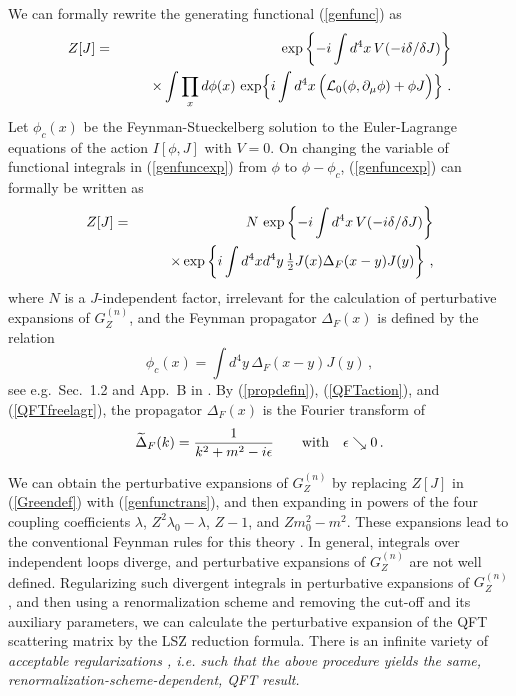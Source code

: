\documentclass[a4paper,12pt]{article}
\newcommand{\half}{{\textstyle{1\over2}}}
\newcommand{\polje}{\phi}
\newcommand{\akcija}{I}
\newcommand{\Lag}{{\cal L}}
\newcommand{\Lagf}{\Lag_{0}}
\newcommand{\Lagi}{V}
\newcommand{\prop}{\widetilde{\Delta}}
\newcommand{\propF}{\prop_F}
\newcommand{\Gf}{G^{(n)}}
\newcommand{\GfZ}{\Gf_Z}
\begin{document}
We can formally rewrite the generating functional (\ref{genfunc}) as
\begin{eqnarray}
   Z[J] &=& \exp \left \{ -i \int d^4x \, \Lagi( -i\delta/ \delta J ) \right \} \nonumber\\
        & & \qquad\times \int \prod_{x} d\polje(x) \, \exp \Bigl \{ i \int d^4x \left( \Lagf(\polje, \partial_\mu \polje) + \polje J \Bigr) \right\} \,.
  \label{genfuncexp}
\end{eqnarray}
Let $\polje_c(x)$ be the Feynman-Stueckelberg solution to the Euler-Lagrange equations of the action $\akcija[\polje,J]$ with $\Lagi = 0$. On changing the variable of functional integrals in (\ref{genfuncexp}) from $\polje$ to $\polje - \polje_c$, (\ref{genfuncexp}) can formally be written as
\begin{eqnarray}
   Z[J] &=& N \, \exp \left \{ -i \int d^4x \, \Lagi( -i\delta/ \delta J ) \right \} \nonumber \\
        & & \qquad\times  \exp \left \{ i \int d^4x d^4y \, \half J(x) \Delta_F(x-y) J(y) \right \}  \,,
   \label{genfunctrans}
\end{eqnarray}
where $N$ is a $J$-independent factor, irrelevant for the calculation of perturbative expansions of $\GfZ$, and the Feynman propagator $\Delta_F(x)$ is defined by the relation
\begin{equation}
   \polje_c(x) = \int  d^4y\, \Delta_F(x-y) J(y) \,,
   \label{propdefin}
\end{equation}
see e.g.~Sec.~1.2 and App.~B in \cite{Cheng}. By (\ref{propdefin}), (\ref{QFTaction}), and (\ref{QFTfreelagr}), the propagator $\Delta_F(x)$ is the Fourier transform of 
\begin{equation}
   \propF(k) = {1 \over k^2 + m^2 - i\epsilon} \qquad\hbox{with}\quad \epsilon \searrow 0 \,.
   \label{origprop}
\end{equation}

We can obtain the perturbative expansions of $\GfZ$ by replacing $Z[J]$ in (\ref{Greendef}) with (\ref{genfunctrans}), and then expanding in powers of the four coupling coefficients $\lambda$, $Z^2\lambda_0 -\lambda$, $Z - 1$, and $Z m_0^2 - m^2$. These expansions lead to the conventional Feynman rules for this theory \cite{Weinberg,Cheng}. In general, integrals over independent loops diverge, and perturbative expansions of $\GfZ$ are not well defined. Regularizing such divergent integrals in perturbative expansions of $\GfZ$, and then using a renormalization scheme and removing the cut-off and its auxiliary parameters, we can calculate the perturbative expansion of the QFT scattering matrix by the LSZ reduction formula. There is an infinite variety of \it acceptable regularizations \rm, i.e. such that the above procedure yields the same, renormalization-scheme-dependent, QFT result.
\end{document}
